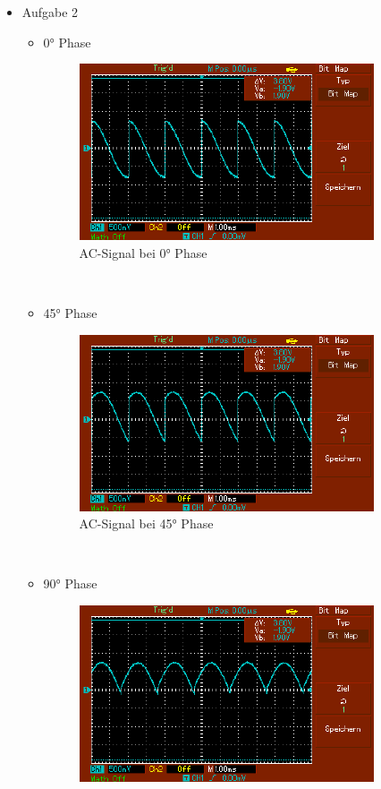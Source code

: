 \documentclass[captions=tableheading]{scrartcl}
\begin{document}
\begin{itemize}
        \newpage
        \item{Aufgabe 2 \\}
            \begin{itemize}
            \item{0° Phase}
            \begin{figure}
                \centering
                \includegraphics{Lock_In Bilder/Aufgabe 2/MAP001.pdf}
                \caption{AC-Signal bei 0° Phase}
                \label{fig:0sig}
            \end{figure}
            \\
            \item{45° Phase}
            \begin{figure}
                \centering
                \includegraphics{Lock_In Bilder/Aufgabe 2/MAP002.pdf}
                \caption{AC-Signal bei 45° Phase}
                \label{fig:45sig}
            \end{figure}
            \\
            \item{90° Phase}
            \begin{figure}
                \centering
                \includegraphics{Lock_In Bilder/Aufgabe 2/MAP003.pdf}

\end{figure}
\end{itemize}
\end{itemize}
\end{document}
